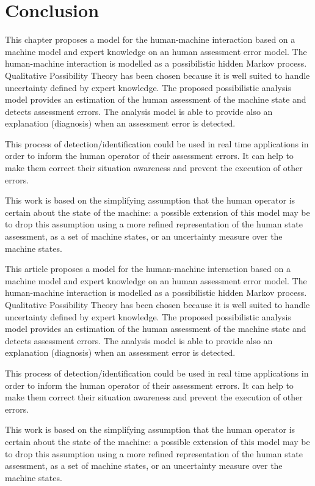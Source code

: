 \section{Conclusion}
This chapter proposes a model for the human-machine interaction based 
on a machine model and expert knowledge on an human assessment error model.
The human-machine interaction is modelled as a possibilistic hidden Markov process. 
Qualitative Possibility Theory has been chosen because 
it is well suited to handle uncertainty defined by expert knowledge. 
The proposed possibilistic analysis model provides 
an estimation of the human assessment of the machine state 
and detects assessment errors. 
The analysis model is able to provide also an explanation (diagnosis) 
when an assessment error is detected.

This process of detection/identification 
could be used in real time applications in order to 
inform the human operator of their assessment errors.
It can help to make them correct their situation awareness 
and prevent the execution of other errors.

This work is based on the simplifying assumption 
that the human operator is certain about the state 
of the machine: a possible extension of this model 
may be to drop this assumption using a more refined 
representation of the human state assessment, 
as a set of machine states, or an uncertainty 
measure over the machine states.

This article proposes a model for the human-machine interaction based 
on a machine model and expert knowledge on an human assessment error model.
The human-machine interaction is modelled as a possibilistic hidden Markov process. 
Qualitative Possibility Theory has been chosen because 
it is well suited to handle uncertainty defined by expert knowledge. 
The proposed possibilistic analysis model provides 
an estimation of the human assessment of the machine state 
and detects assessment errors. 
The analysis model is able to provide also an explanation (diagnosis) 
when an assessment error is detected.

This process of detection/identification 
could be used in real time applications in order to 
inform the human operator of their assessment errors.
It can help to make them correct their situation awareness 
and prevent the execution of other errors.

This work is based on the simplifying assumption 
that the human operator is certain about the state 
of the machine: a possible extension of this model 
may be to drop this assumption using a more refined 
representation of the human state assessment, 
as a set of machine states, or an uncertainty 
measure over the machine states.

